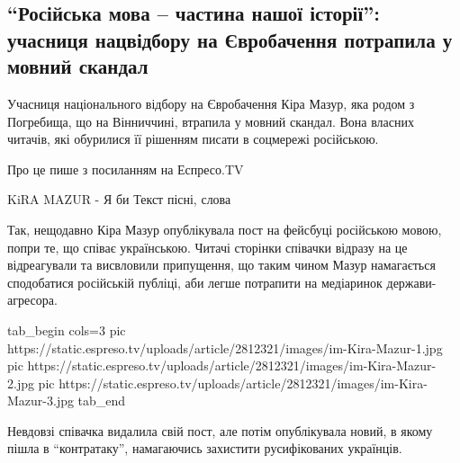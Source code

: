  
 
 
 
 
 
\subsection{``Російська мова – частина нашої історії'': учасниця нацвідбору на Євробачення потрапила у мовний скандал}
\label{sec:28_11_2020.news.ua.cynicallviv.1.kira_mazur_jazyk}

Учасниця національного відбору на Євробачення Кіра Мазур, яка родом з
Погребища, що на Вінниччині, втрапила у мовний скандал. Вона 
власних читачів, які обурилися її рішенням писати в соцмережі російською.

Про це пише  з посиланням на Еспресо.TV

KiRA MAZUR - Я би Текст пісні, слова

Так, нещодавно Кіра Мазур опублікувала пост на фейсбуці російською мовою, попри
те, що співає українською. Читачі сторінки співачки відразу на це відреагували
та висвловили припущення, що таким чином Мазур намагається сподобатися
російській публіці, аби легше потрапити на медіаринок держави-агресора.

\ifcmt
tab_begin cols=3
  pic https://static.espreso.tv/uploads/article/2812321/images/im-Kira-Mazur-1.jpg
  pic https://static.espreso.tv/uploads/article/2812321/images/im-Kira-Mazur-2.jpg
  pic https://static.espreso.tv/uploads/article/2812321/images/im-Kira-Mazur-3.jpg 
tab_end
\fi

Невдовзі співачка видалила свій пост, але потім опублікувала новий, в якому
пішла в ``контратаку'', намагаючись захистити русифікованих українців.

